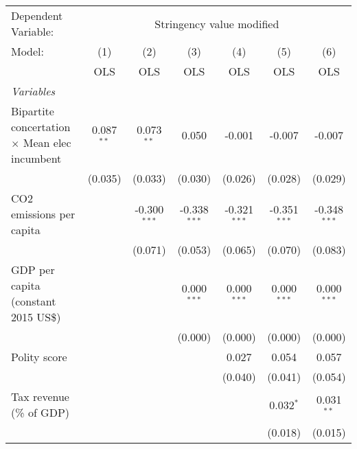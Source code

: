 
\begingroup
\centering
\begin{tabular}{lcccccc}
   \toprule
   Dependent Variable: & \multicolumn{6}{c}{Stringency value modified}\\
   Model:                                               & (1)          & (2)            & (3)            & (4)            & (5)            & (6)\\  
                                                        &  OLS         & OLS            & OLS            & OLS            & OLS            & OLS\\  
   \midrule
   \emph{Variables}\\
   Bipartite concertation $\times$ Mean elec incumbent  & 0.087$^{**}$ & 0.073$^{**}$   & 0.050          & -0.001         & -0.007         & -0.007\\   
                                                        & (0.035)      & (0.033)        & (0.030)        & (0.026)        & (0.028)        & (0.029)\\   
   CO2 emissions per capita                             &              & -0.300$^{***}$ & -0.338$^{***}$ & -0.321$^{***}$ & -0.351$^{***}$ & -0.348$^{***}$\\   
                                                        &              & (0.071)        & (0.053)        & (0.065)        & (0.070)        & (0.083)\\   
   GDP per capita (constant 2015 US\$)                  &              &                & 0.000$^{***}$  & 0.000$^{***}$  & 0.000$^{***}$  & 0.000$^{***}$\\   
                                                        &              &                & (0.000)        & (0.000)        & (0.000)        & (0.000)\\   
   Polity score                                         &              &                &                & 0.027          & 0.054          & 0.057\\   
                                                        &              &                &                & (0.040)        & (0.041)        & (0.054)\\   
   Tax revenue (\% of GDP)                              &              &                &                &                & 0.032$^{*}$    & 0.031$^{**}$\\   
                                                        &              &                &                &                & (0.018)        & (0.015)\\   

\end{tabular}
